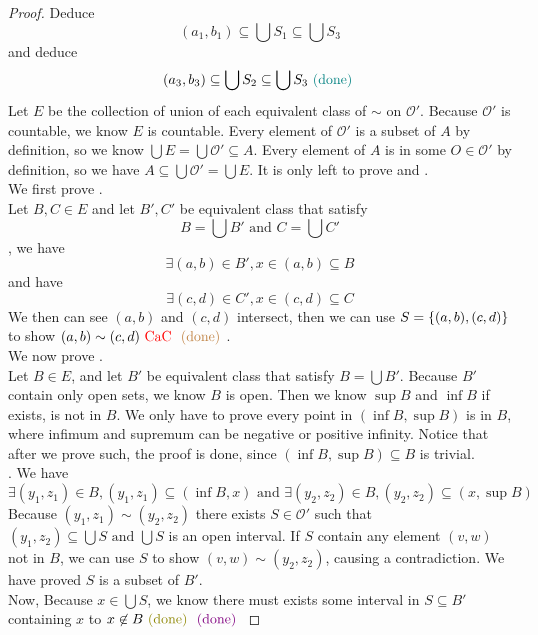 \documentclass{report}
\begin{document}
\begin{proof}
Deduce
\begin{equation}
  (a_1,b_1)\subseteq \bigcup S_1\subseteq \bigcup S_3
\end{equation}
and deduce
\begin{equation}
  (a_3,b_3)\subseteq \bigcup S_2\subseteq \bigcup S_3\textcolor{teal}{\text{ (done) }}
\end{equation}
Let $E$ be the collection of union of each equivalent class of $\sim$ on $\mathcal{O}'$. Because $\mathcal{O}'$ is countable, we know $E$ is countable. Every element of $\mathcal{O}'$ is a subset of $A$ by definition, so we know  $\bigcup E=\bigcup \mathcal{O}'\subseteq A$. Every element of $A$ is in some  $O\in \mathcal{O}'$ by definition, so we have $A\subseteq \bigcup \mathcal{O}'=\bigcup E$. It is only left to prove  and .\\

We first prove .\\

Let $B,C\in E$ and let $B',C'$ be equivalent class that satisfy
\begin{equation}
B=\bigcup B'\text{ and }C=\bigcup C'
\end{equation}
, we have
\begin{equation}
\exists (a,b)\in B', x\in (a,b)\subseteq B
\end{equation}
and have
\begin{equation}
\exists (c,d)\in C',x \in (c,d)\subseteq C
\end{equation}
We then can see $(a,b)$ and $(c,d)$ intersect, then we can use $S=\{ (a,b),(c,d) \}$ to show $(a,b)\sim (c,d)\text{ \textcolor{red}{CaC} }\textcolor{brown}{\text{ (done) }}$.\\

We now prove  .\\
 
Let $B\in E$, and let $B'$ be equivalent class that satisfy  $B=\bigcup B'$. Because $B'$ contain only open sets, we know  $B$ is open. Then we know $\sup  B$ and $\inf B$ if exists, is not in $B$. We only have to prove every point in $(\inf B,\sup  B)$ is in $B$, where infimum and supremum can be negative or positive infinity. Notice that after we prove such, the proof is done, since $(\inf B,\sup B)\subseteq B$ is trivial.\\

. We have
\begin{equation}
\exists (y_1,z_1)\in B, (y_1,z_1)\subseteq (\inf B,x)\text{ and }\exists (y_2,z_2)\in B, (y_2,z_2)\subseteq (x,\sup B)
\end{equation}
Because $(y_1,z_1)\sim (y_2,z_2)$ there exists $S\in \mathcal{O}'$ such that $(y_1,z_2)\subseteq \bigcup S\text{ and }\bigcup S$ is an open interval. If $S$ contain any element  $(v,w)$ not in $B$, we can use  $S$ to show  $(v,w)\sim (y_2,z_2)$, causing a contradiction. We have proved $S$ is a subset of  $B'$.\\

Now, Because $x\in \bigcup S$, we know there must exists some interval in $S\subseteq B'$ containing  $x$  \CaC to $x\not\in B\odone\vdone$
\end{proof}
\end{document}
